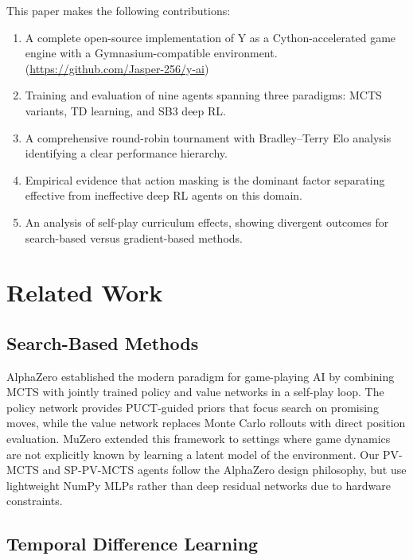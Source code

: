 \documentclass[conference]{IEEEtran}
\begin{document}
This paper makes the following contributions:

\begin{enumerate}
  \item A complete open-source implementation of Y as a Cython-accelerated game
    engine with a Gymnasium-compatible environment. (\href{https://github.com/Jasper-256/y-ai}{https://github.com/Jasper-256/y-ai})
  \item Training and evaluation of nine agents spanning three paradigms: MCTS
    variants, TD learning, and SB3 deep RL.
  \item A comprehensive round-robin tournament with Bradley--Terry Elo analysis
    identifying a clear performance hierarchy.
  \item Empirical evidence that action masking is the dominant factor separating
    effective from ineffective deep RL agents on this domain.
  \item An analysis of self-play curriculum effects, showing divergent outcomes
    for search-based versus gradient-based methods.
\end{enumerate}

\section{Related Work}

\subsection{Search-Based Methods}

AlphaZero \cite{silver2017} established the modern paradigm for game-playing AI
by combining MCTS with jointly trained policy and value networks in a self-play
loop. The policy network provides PUCT-guided priors that focus search on
promising moves, while the value network replaces Monte Carlo rollouts with
direct position evaluation. MuZero \cite{schrittwieser2021} extended this
framework to settings where game dynamics are not explicitly known by learning a
latent model of the environment. Our PV-MCTS and SP-PV-MCTS agents follow the
AlphaZero design philosophy, but use lightweight NumPy MLPs rather than deep
residual networks due to hardware constraints.

\subsection{Temporal Difference Learning}
\end{document}
